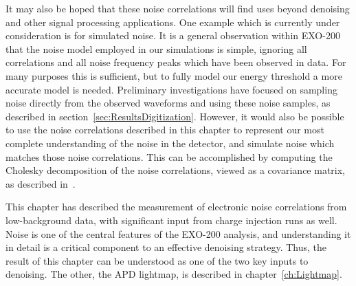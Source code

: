 It may also be hoped that these noise correlations will find uses beyond denoising and other signal processing applications.  One example which is currently under consideration is for simulated noise.  It is a general observation within EXO-200 that the noise model employed in our simulations is simple, ignoring all correlations and all noise frequency peaks which have been observed in data.  For many purposes this is sufficient, but to fully model our energy threshold a more accurate model is needed.  Preliminary investigations have focused on sampling noise directly from the observed waveforms and using these noise samples, as described in section~\ref{sec:ResultsDigitization}.  However, it would also be possible to use the noise correlations described in this chapter to represent our most complete understanding of the noise in the detector, and simulate noise which matches those noise correlations.  This can be accomplished by computing the Cholesky decomposition of the noise correlations, viewed as a covariance matrix, as described in~\cite{ross2012simulation}.

This chapter has described the measurement of electronic noise correlations from low-background data, with significant input from charge injection runs as well.  Noise is one of the central features of the EXO-200 analysis, and understanding it in detail is a critical component to an effective denoising strategy.  Thus, the result of this chapter can be understood as one of the two key inputs to denoising.  The other, the APD lightmap, is described in chapter~\ref{ch:Lightmap}.
